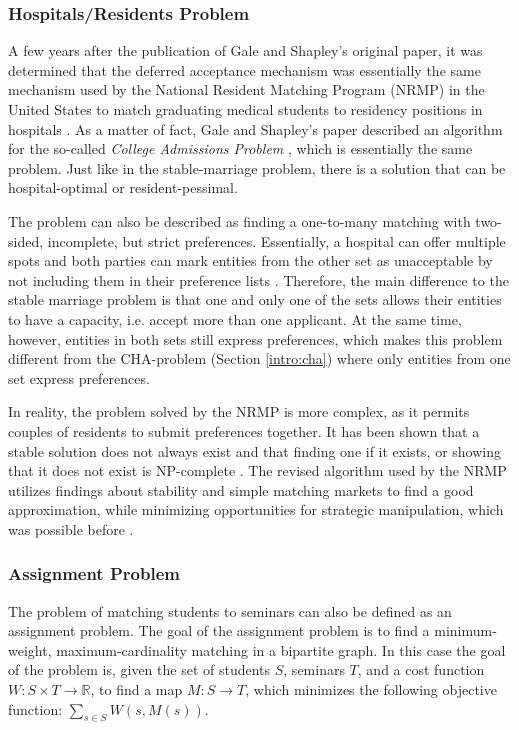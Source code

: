 \subsubsection{Hospitals/Residents Problem}\label{intro:hospital-residents}
A few years after the publication of Gale and Shapley's original paper, it was determined that the deferred acceptance mechanism was essentially the same mechanism used by the National Resident Matching Program (NRMP) in the United States to match graduating medical students to residency positions in hospitals \cite{Gusfield}. As a matter of fact, Gale and Shapley's paper described an algorithm for the so-called \emph{College Admissions Problem} \cite{GaleShapleyOrig}, which is essentially the same problem. Just like in the stable-marriage problem, there is a solution that can be hospital-optimal or resident-pessimal. 

The problem can also be described as finding a one-to-many matching with two-sided, incomplete, but strict preferences. Essentially, a hospital can offer multiple spots and both parties can mark entities from the other set as unacceptable by not including them in their preference lists \cite{RePEc:ris:nobelp:2012_005}. Therefore, the main difference to the stable marriage problem is that one and only one of the sets allows their entities to have a capacity, i.e. accept more than one applicant. At the same time, however, entities in both sets still express preferences, which makes this problem different from the CHA-problem (Section \ref{intro:cha}) where only entities from one set express preferences.

In reality, the problem solved by the NRMP is more complex, as it permits couples of residents to submit preferences together. It has been shown that a stable solution does not always exist and that finding one if it exists, or showing that it does not exist is NP-complete \cite{RONN1990285}. The revised algorithm used by the NRMP utilizes findings about stability and simple matching markets to find a good approximation, while minimizing opportunities for strategic manipulation, which was possible before \cite{NBERw6963}.

\subsubsection{Assignment Problem}\label{intro_assignment}
The problem of matching students to seminars can also be defined as an assignment problem. The goal of the assignment problem is to find a minimum-weight, maximum-cardinality matching in a bipartite graph. In this case the goal of the problem is, given the set of students $S$, seminars $T$, and a cost function $W: S \times T \rightarrow \mathbb{R}$, to find a map $M: S \rightarrow T$, which minimizes the following objective function:
$\sum_{s \in S} W(s, M(s))$.

